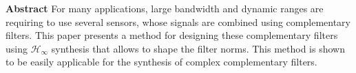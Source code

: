\textbf{Abstract}
For many applications, large bandwidth and dynamic ranges are requiring to use several sensors, whose signals are combined using complementary filters.
This paper presents a method for designing these complementary filters using $\mathcal{H}_\infty$ synthesis that allows to shape the filter norms.
This method is shown to be easily applicable for the synthesis of complex complementary filters.
